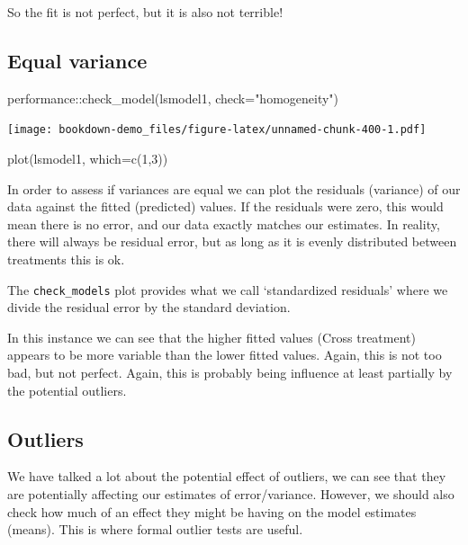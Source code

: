 \documentclass[
]{book}
\newenvironment{Shaded}{\begin{snugshade}}{\end{snugshade}}
\newcommand{\AttributeTok}[1]{\textcolor[rgb]{0.77,0.63,0.00}{#1}}
\newcommand{\DecValTok}[1]{\textcolor[rgb]{0.00,0.00,0.81}{#1}}
\newcommand{\FunctionTok}[1]{\textcolor[rgb]{0.00,0.00,0.00}{#1}}
\newcommand{\NormalTok}[1]{#1}
\newcommand{\SpecialCharTok}[1]{\textcolor[rgb]{0.00,0.00,0.00}{#1}}
\newcommand{\StringTok}[1]{\textcolor[rgb]{0.31,0.60,0.02}{#1}}
\begin{document}
So the fit is not perfect, but it is also not terrible!

\hypertarget{equal-variance}{%
\subsection{Equal variance}\label{equal-variance}}

\begin{Shaded}
\begin{Highlighting}[]
\NormalTok{performance}\SpecialCharTok{::}\FunctionTok{check\_model}\NormalTok{(lsmodel1, }\AttributeTok{check=}\StringTok{"homogeneity"}\NormalTok{)}
\end{Highlighting}
\end{Shaded}

\texttt{[image: bookdown-demo\_files/figure-latex/unnamed-chunk-400-1.pdf]}

\begin{Shaded}
\begin{Highlighting}[]
\FunctionTok{plot}\NormalTok{(lsmodel1, }\AttributeTok{which=}\FunctionTok{c}\NormalTok{(}\DecValTok{1}\NormalTok{,}\DecValTok{3}\NormalTok{))}
\end{Highlighting}
\end{Shaded}

In order to assess if variances are equal we can plot the residuals (variance) of our data against the fitted (predicted) values. If the residuals were zero, this would mean there is no error, and our data exactly matches our estimates. In reality, there will always be residual error, but as long as it is evenly distributed between treatments this is ok.

The \texttt{check\_models} plot provides what we call `standardized residuals' where we divide the residual error by the standard deviation.

In this instance we can see that the higher fitted values (Cross treatment) appears to be more variable than the lower fitted values. Again, this is not too bad, but not perfect. Again, this is probably being influence at least partially by the potential outliers.

\hypertarget{outliers}{%
\subsection{Outliers}\label{outliers}}

We have talked a lot about the potential effect of outliers, we can see that they are potentially affecting our estimates of error/variance. However, we should also check how much of an effect they might be having on the model estimates (means). This is where formal outlier tests are useful.
\end{document}
